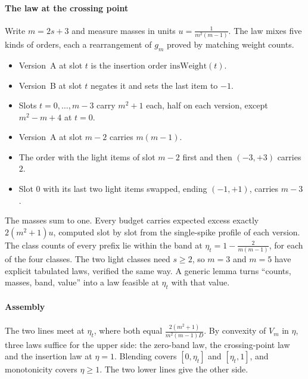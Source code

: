 \paragraph{The law at the crossing point} Write $m=2s+3$ and measure masses in units
$u=\frac{1}{m^{2}(m-1)}$. The law mixes five kinds of orders, each a rearrangement of $g_{m}$
proved by matching weight counts.
\begin{itemize}
\item Version~A at slot $t$ is the insertion order $\mathrm{insWeight}(t)$.
\item Version~B at slot $t$ negates it and sets the last item to $-1$.
\item Slots $t=0,\dots,m-3$ carry $m^{2}+1$ each, half on each version, except
$m^{2}-m+4$ at $t=0$.
\item Version~A at slot $m-2$ carries $m(m-1)$.
\item The order with the light items of slot $m-2$ first and then $(-3,+3)$ carries $2$.
\item Slot $0$ with its last two light items swapped, ending $(-1,+1)$, carries $m-3$.
\end{itemize}
The masses sum to one. Every budget carries expected excess exactly $2(m^{2}+1)u$, computed
slot by slot from the single-spike profile of each version. The class counts of every prefix
lie within the band at $\eta_{t}=1-\frac{2}{m(m-1)}$, for each of the four classes. The two
light classes need $s\ge2$, so $m=3$ and $m=5$ have explicit tabulated laws, verified the
same way. A generic lemma turns ``counts, masses, band, value'' into a law feasible at
$\eta_{t}$ with that value.


\paragraph{Assembly} The two lines meet at $\eta_{t}$, where both equal
$\frac{2(m^{2}+1)}{m^{2}(m-1)D}$. By convexity of $V_{m}$ in $\eta$, three laws suffice for
the upper side: the zero-band law, the crossing-point law and the insertion law at
$\eta=1$. Blending covers $[0,\eta_{t}]$ and $[\eta_{t},1]$, and monotonicity covers
$\eta\ge1$. The two lower lines give the other side.

